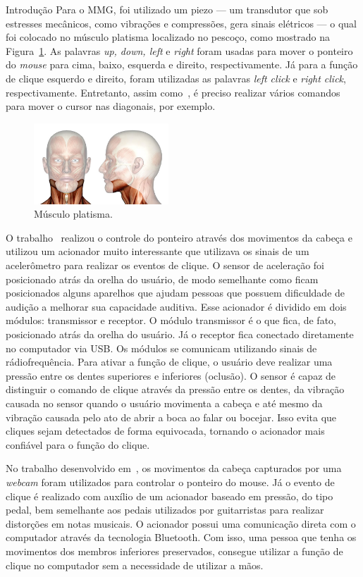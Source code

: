 \begin{chapter}{Introdução}
Para o MMG, foi utilizado um piezo --- um transdutor que sob estresses
mecânicos, como vibrações e compressões, gera sinais elétricos --- o qual foi
colocado no músculo platisma localizado no pescoço, como mostrado na
Figura~\ref{fig:platisma}. As palavras \textit{up, down, left} e \textit{right}
foram usadas para mover o ponteiro do \textit{mouse} para cima, baixo, esquerda
e direito, respectivamente. Já para a função de clique esquerdo e direito, foram
utilizadas as palavras \textit{left click} e \textit{right click},
respectivamente. Entretanto, assim como~\cite{Karimullah02}, é preciso realizar
vários comandos para mover o cursor nas diagonais, por exemplo.
\begin{figure}[!h]
	\centering
	\includegraphics[width=0.45\textwidth]{fig/platisma}
	\caption{Músculo platisma.}
	\label{fig:platisma}
\end{figure}

O trabalho~\cite{Simpson08} realizou o controle do ponteiro através dos
movimentos da cabeça e utilizou um acionador muito interessante que
utilizava os sinais de um acelerômetro para realizar os eventos de clique. O
sensor de aceleração foi posicionado atrás da orelha do usuário, de modo
semelhante como ficam posicionados alguns aparelhos que ajudam pessoas que
possuem dificuldade de audição a melhorar sua capacidade auditiva. Esse
acionador é dividido em dois módulos: transmissor e receptor. O módulo
transmissor é o que fica, de fato, posicionado atrás da orelha do usuário. Já o
receptor fica conectado diretamente no computador via USB. Os módulos se
comunicam utilizando sinais de rádiofrequência. Para ativar a função de clique,
o usuário deve realizar uma pressão entre os dentes superiores e inferiores
(oclusão).  O sensor é capaz de distinguir o comando de clique através da
pressão entre os dentes, da vibração causada no sensor quando o usuário
movimenta a cabeça e até mesmo da vibração causada pelo ato de abrir a boca ao
falar ou bocejar. Isso evita que cliques sejam detectados de forma equivocada,
tornando o acionador mais confiável para o função do clique.

No trabalho desenvolvido em~\cite{Antunes16}, os movimentos da cabeça capturados
por uma \textit{webcam} foram utilizados para controlar o ponteiro do mouse. Já
o evento de clique é realizado com auxílio de um acionador baseado em pressão,
do tipo pedal, bem semelhante aos pedais utilizados por guitarristas para
realizar distorções em notas musicais. O acionador possui uma comunicação direta
com o computador através da tecnologia Bluetooth. Com isso, uma pessoa que tenha
os movimentos dos membros inferiores preservados, consegue utilizar a função de
clique no computador sem a necessidade de utilizar a mãos. 


\end{chapter}
